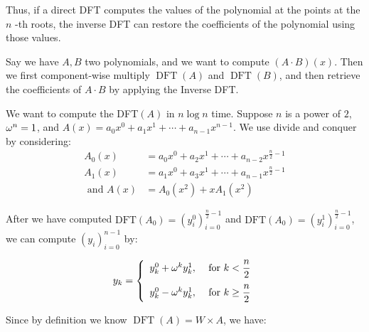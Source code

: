 
Thus, if a direct DFT computes the values of the polynomial at the points at the $n$ -th roots, the inverse DFT can restore the coefficients of the polynomial using those values.


\begin{algo} 
    Say we have $A, B$ two polynomials, and we want to compute $(A\cdot
    B)(x)$. Then we first component-wise multiply $ \operatorname{DFT}(A) $
    and $ \operatorname{DFT}(B) $, and then retrieve the coefficients of $
    A\cdot B $ by applying the Inverse DFT.  
\end{algo}


\begin{algo} 
    We want to compute the DFT$ (A) $ in $ n\log n $ time. Suppose $ n $ is a
    power of $ 2 $, $ \omega^n = 1 $, and $ A(x) = a_{0} x^{0}+a_{1}
    x^{1}+\cdots+a_{n-1} x^{n-1} $. We use divide and conquer by considering: 
    \begin{align*} A_{0}(x)&=a_{0} x^{0}+a_{2}
        x^{1}+\cdots+a_{n-2} x^{\frac{n}{2}-1} \\ A_{1}(x)&=a_{1} x^{0}+a_{3}
        x^{1}+\cdots+a_{n-1} x^{\frac{n}{2}-1}\\[.5em] \text{ and } A(x) &= A_0(x^2) +
        xA_1(x^2) 
    \end{align*}

    After we have computed $ \text{DFT}(A_0) = (y^0_i)^{\frac{n}{2} - 1}_{i=0}
    $ and $ \text{DFT}(A_0) = (y^1_i)^{\frac{n}{2} - 1}_{i=0} $, we can
    compute $ (y_i)^{n-1}_{i=0} $ by: 

    \[ y_k = \left\{ \begin{array}{ll} y^0_k
            + \omega^ky^1_k, &\text{ for } k < \dfrac{n}{2}\\[1em] y^0_k -
            \omega^ky^1_k, &\text{ for } k \ge \dfrac{n}{2} 
    \end{array} \right. \]
\end{algo}

\begin{algo} 
    Since by definition we know $ \operatorname{DFT}(A) = W\times A $, we have: 
\end{algo}



